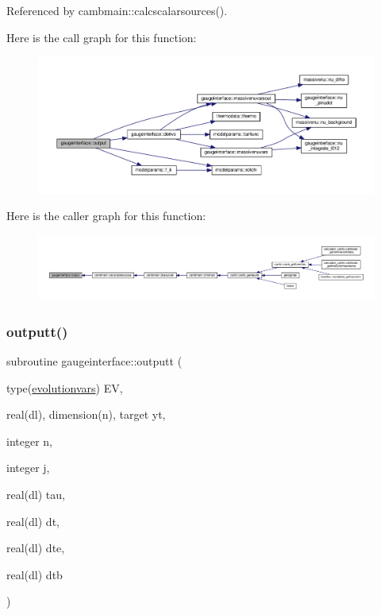 Referenced by cambmain\+::calcscalarsources().

Here is the call graph for this function\+:
\nopagebreak
\begin{figure}[H]
\begin{center}
\leavevmode
\includegraphics[width=350pt]{namespacegaugeinterface_ac370c67bc9750bf5749a69531fe3ffc1_cgraph}
\end{center}
\end{figure}
Here is the caller graph for this function\+:
\nopagebreak
\begin{figure}[H]
\begin{center}
\leavevmode
\includegraphics[width=350pt]{namespacegaugeinterface_ac370c67bc9750bf5749a69531fe3ffc1_icgraph}
\end{center}
\end{figure}
\mbox{\label{namespacegaugeinterface_a5235d59ec77fa4b3a41d9754c8e447ca}} 
\subsubsection{\texorpdfstring{outputt()}{outputt()}}
{\footnotesize\ttfamily subroutine gaugeinterface\+::outputt (\begin{DoxyParamCaption}\item[{type(\mbox{\hyperlink{structgaugeinterface_1_1evolutionvars}{evolutionvars}})}]{EV,  }\item[{real(dl), dimension(n), target}]{yt,  }\item[{integer}]{n,  }\item[{integer}]{j,  }\item[{real(dl)}]{tau,  }\item[{real(dl)}]{dt,  }\item[{real(dl)}]{dte,  }\item[{real(dl)}]{dtb }\end{DoxyParamCaption})}



